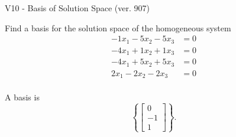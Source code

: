 \begin{exercise}
  \begin{exerciseTitle}V10 - Basis of Solution Space (ver. 907)\end{exerciseTitle}
  \begin{exerciseStatement}
    Find a basis for the solution space of the homogeneous system 
\begin{align*}
 -1 x_ 1 -5 x_ 2 -5 x_ 3 &= 0  \\ 
  -4 x_ 1 + 1 x_ 2 + 1 x_ 3 &= 0  \\ 
  -4 x_ 1 + 5 x_ 2 + 5 x_ 3 &= 0  \\ 
  2 x_ 1 -2 x_ 2 -2 x_ 3 &= 0  \\ 
 \end{align*}


 
  \end{exerciseStatement}

  \begin{exerciseAnswer}
   A basis is   
\[\left\{\left[\begin{array}{c}
0 \\
-1 \\
1
\end{array}\right]\right\}.\]

  


  \end{exerciseAnswer}
\end{exercise}